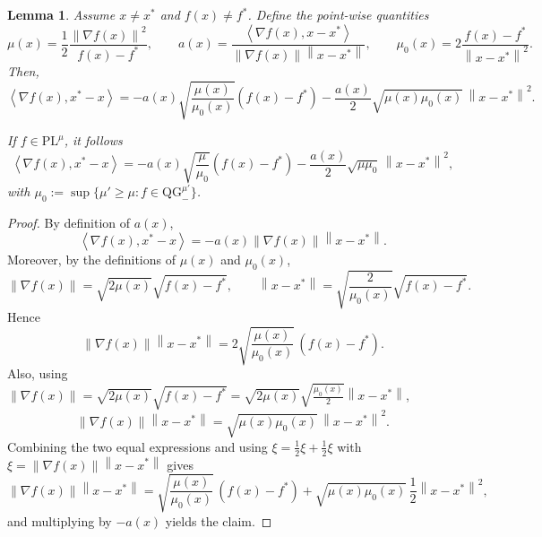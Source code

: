 \documentclass{article}
\def\R{{\mathbb{R}}}
\def\pl{{\text{PL}^\mu}}
\newcommand{\norm}[1]{\left\lVert#1\right\rVert}
\newcommand{\dotprod}[1]{\left< #1\right>}
\newcommand{\ls}{\text{LS}^{L}}
\newcommand{\qginff}[1]{\text{QG}_{-}^{#1}}
\theoremstyle{plain}
\newtheorem{lemma}[theorem]{Lemma}
\theoremstyle{definition}
\theoremstyle{remark}
\begin{document}

\begin{lemma}\label{lem:tec:exact_scalar_prod_bound}
Assume $x\neq x^\ast$ and $f(x)\neq f^\ast$. Define the point-wise quantities
\[
\mu(x) = \frac{1}{2}\frac{\norm{\nabla f(x)}^2}{f(x)-f^\ast},\qquad
a(x) =\frac{\dotprod{\nabla f(x),x-x^\ast}}{\norm{\nabla f(x)}\norm{x-x^\ast}},\qquad
\mu_0(x) = 2\frac{f(x)-f^\ast}{\norm{x-x^\ast}^2}.
\]
Then,
\[
\dotprod{\nabla f(x), x^\ast - x}
=  -a(x) \sqrt{\frac{\mu(x)}{\mu_0(x)}}(f(x)-f^\ast)
   - \frac{a(x)}{2}\sqrt{\mu(x)\mu_0(x)}\,\norm{x-x^\ast}^2.
\]

If $f \in \pl$, it follows
\[
\dotprod{\nabla f(x), x^\ast - x}
=  -a(x) \sqrt{\frac{\mu}{\mu_0}}(f(x)-f^\ast)
   - \frac{a(x)}{2}\sqrt{\mu\mu_0}\,\norm{x-x^\ast}^2,
\]
with $
\mu_0 := \sup \{\mu'\ge \mu: f \in  \qginff{\mu'} \}$.
\end{lemma}

\begin{proof}

By definition of $a(x)$,
\[
\dotprod{\nabla f(x), x^\ast - x} = -a(x)\norm{\nabla f(x)}\norm{x-x^\ast}.
\]
Moreover, by the definitions of $\mu(x)$ and $\mu_0(x)$,
\[
\norm{\nabla f(x)} = \sqrt{2\mu(x)}\sqrt{f(x)-f^\ast},
\qquad
\norm{x-x^\ast} = \sqrt{\frac{2}{\mu_0(x)}}\sqrt{f(x)-f^\ast}.
\]
Hence
\[
\norm{\nabla f(x)}\norm{x-x^\ast}
= 2\sqrt{\frac{\mu(x)}{\mu_0(x)}}\,(f(x)-f^\ast).
\]
Also, using $\norm{\nabla f(x)} = \sqrt{2\mu(x)}\sqrt{f(x)-f^\ast} =\sqrt{2\mu(x)} \sqrt{\frac{\mu_0(x)}{2}}\norm{x-x^\ast}$,
\[
\norm{\nabla f(x)}\norm{x-x^\ast}
= \sqrt{\mu(x)\mu_0(x)}\,\norm{x-x^\ast}^2.
\]
Combining the two equal expressions and using $\xi = \frac12\xi+\frac12\xi$ with
$\xi= \norm{\nabla f(x)}\norm{x-x^\ast}$ gives
\[
\norm{\nabla f(x)}\norm{x-x^\ast}
=
\sqrt{\frac{\mu(x)}{\mu_0(x)}}\,(f(x)-f^\ast)
+\sqrt{\mu(x)\mu_0(x)}\,\frac{1}{2}\norm{x-x^\ast}^2,
\]
and multiplying by $-a(x)$ yields the claim.
\end{proof}




\end{document}

